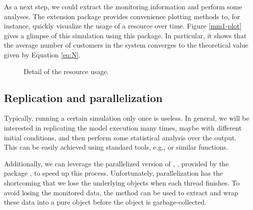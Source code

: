 \documentclass[
  nojss]{jss}
\begin{document}
As a next step, we could extract the monitoring information and perform
some analyses. The extension package 
\citep{CRAN:simmer.plot} provides convenience plotting methods to, for
instance, quickly visualize the usage of a resource over time. Figure
\ref{mm1-plot} gives a glimpse of this simulation using this package. In
particular, it shows that the average number of customers in the system
converges to the theoretical value given by Equation \ref{eq:N}.

\begin{CodeChunk}
\begin{figure}

{\centering {}

}

\caption[Detail of the resource usage\label{mm1-plot}]{Detail of the resource usage\label{mm1-plot}.}\label{fig:mm1-plot}
\end{figure}
\end{CodeChunk}

\hypertarget{replication-and-parallelization}{%
\subsection{Replication and
parallelization}\label{replication-and-parallelization}}

Typically, running a certain simulation only once is useless. In
general, we will be interested in replicating the model execution many
times, maybe with different initial conditions, and then perform some
statistical analysis over the output. This can be easily achieved using
standard  tools, e.g.,  or similar functions.

Additionally, we can leverage the parallelized version of
, , provided by the 
package \citep{CRAN:r}, to speed up this process. Unfortunately,
parallelization has the shortcoming that we lose the underlying
 objects when each thread finishes. To avoid losing the
monitored data, the  method can be used to extract and wrap
these data into a pure  object before the 
object is garbage-collected.
\end{document}
